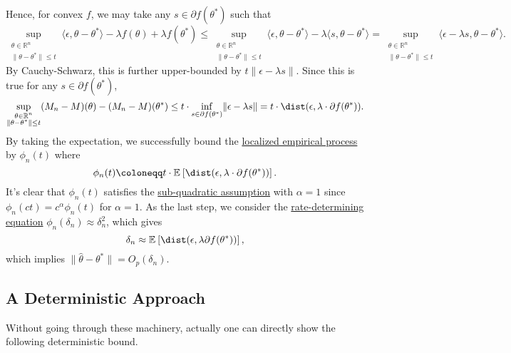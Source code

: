Hence, for convex \(f\), we may take any \(s\in \partial f(\theta ^{\ast} )\) such that
\[
	\sup _{\substack{\theta \in \mathbb{R} ^n                                            \\ \lVert \theta - \theta ^{\ast}  \rVert \leq t }} \langle \epsilon , \theta - \theta ^{\ast} \rangle - \lambda f(\theta ) + \lambda f(\theta ^{\ast} )
	\leq \sup _{\substack{\theta \in \mathbb{R} ^n                                    \\ \lVert \theta - \theta ^{\ast}  \rVert \leq t }} \langle \epsilon , \theta - \theta ^{\ast} \rangle - \lambda \langle s, \theta - \theta ^{\ast}  \rangle
	= \sup _{\substack{\theta \in \mathbb{R} ^n                                       \\ \lVert \theta - \theta ^{\ast}  \rVert \leq t }} \langle \epsilon - \lambda s, \theta - \theta ^{\ast}  \rangle .
\]
By Cauchy-Schwarz, this is further upper-bounded by \(t \lVert \epsilon - \lambda s \rVert\). Since this is true for any \(s\in \partial f(\theta ^{\ast} )\),
\[
	\sup _{\substack{\theta \in \mathbb{R} ^n \\ \lVert \theta - \theta ^{\ast}  \rVert \leq t }} (M_n - M)(\theta ) - (M_n - M)(\theta ^{\ast} )
	\leq t \cdot \inf _{s\in \partial f(\theta ^{\ast} )} \lVert \epsilon - \lambda s \rVert
	= t \cdot \dist(\epsilon , \lambda \cdot \partial f(\theta ^{\ast} )) .
\]
By taking the expectation, we successfully bound the \hyperref[def:localized-EP]{localized empirical process} by \(\phi _n (t)\) where
\[
	\phi _n(t) \coloneqq t \cdot \mathbb{E}_{}\left[\dist(\epsilon , \lambda \cdot \partial f(\theta ^{\ast} ))  \right] .
\]
It's clear that \(\phi _n(t)\) satisfies the \hyperref[def:sub-quadratic-assumption]{sub-quadratic assumption} with \(\alpha = 1\) since \(\phi _n(ct) = c^\alpha \phi _n(t)\) for \(\alpha = 1\). As the last step, we consider the \hyperref[def:rate-determining-equation]{rate-determining equation} \(\phi _n(\delta _n) \approx \delta _n^2\), which gives
\[
	\delta _n \approx \mathbb{E}_{}\left[\dist(\epsilon , \lambda \partial f(\theta ^{\ast} ))  \right] ,
\]
which implies \(\lVert \hat{\theta} - \theta ^{\ast}  \rVert = O_p(\delta _n)\).

\subsection{A Deterministic Approach}
Without going through these machinery, actually one can directly show the following deterministic bound.

